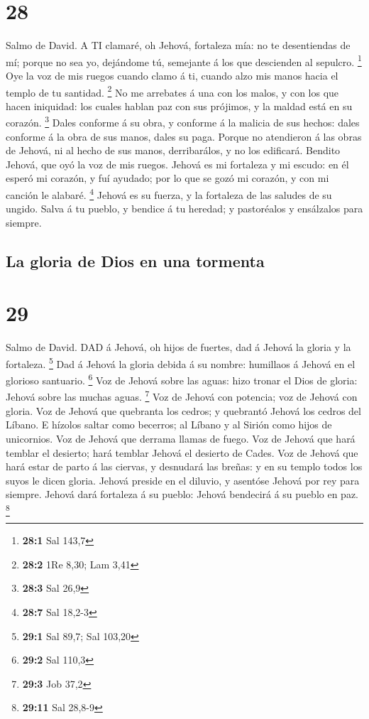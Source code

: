 \hypertarget{section-27}{%
\section{28}\label{section-27}}

 Salmo de David. A TI clamaré, oh Jehová, fortaleza mía: no
te desentiendas de mí; porque no sea yo, dejándome tú, semejante á los
que descienden al sepulcro. \footnote{\textbf{28:1} Sal 143,7}
 Oye la voz de mis ruegos cuando clamo á ti, cuando alzo mis
manos hacia el templo de tu santidad. \footnote{\textbf{28:2} 1Re 8,30;
  Lam 3,41}  No me arrebates á una con los malos, y con los
que hacen iniquidad: los cuales hablan paz con sus prójimos, y la maldad
está en su corazón. \footnote{\textbf{28:3} Sal 26,9}  Dales
conforme á su obra, y conforme á la malicia de sus hechos: dales
conforme á la obra de sus manos, dales su paga.  Porque no
atendieron á las obras de Jehová, ni al hecho de sus manos,
derribarálos, y no los edificará.  Bendito Jehová, que oyó
la voz de mis ruegos.  Jehová es mi fortaleza y mi escudo:
en él esperó mi corazón, y fuí ayudado; por lo que se gozó mi corazón, y
con mi canción le alabaré. \footnote{\textbf{28:7} Sal 18,2-3}
 Jehová es su fuerza, y la fortaleza de las saludes de su
ungido.  Salva á tu pueblo, y bendice á tu heredad; y
pastoréalos y ensálzalos para siempre.

\hypertarget{la-gloria-de-dios-en-una-tormenta}{%
\subsection{La gloria de Dios en una
tormenta}\label{la-gloria-de-dios-en-una-tormenta}}

\hypertarget{section-28}{%
\section{29}\label{section-28}}

 Salmo de David. DAD á Jehová, oh hijos de fuertes, dad á
Jehová la gloria y la fortaleza. \footnote{\textbf{29:1} Sal 89,7; Sal
  103,20}  Dad á Jehová la gloria debida á su nombre:
humillaos á Jehová en el glorioso santuario. \footnote{\textbf{29:2} Sal
  110,3}  Voz de Jehová sobre las aguas: hizo tronar el Dios
de gloria: Jehová sobre las muchas aguas. \footnote{\textbf{29:3} Job
  37,2}  Voz de Jehová con potencia; voz de Jehová con
gloria.  Voz de Jehová que quebranta los cedros; y quebrantó
Jehová los cedros del Líbano.  E hízolos saltar como
becerros; al Líbano y al Sirión como hijos de unicornios. 
Voz de Jehová que derrama llamas de fuego.  Voz de Jehová
que hará temblar el desierto; hará temblar Jehová el desierto de Cades.
 Voz de Jehová que hará estar de parto á las ciervas, y
desnudará las breñas: y en su templo todos los suyos le dicen gloria.
 Jehová preside en el diluvio, y asentóse Jehová por rey
para siempre.  Jehová dará fortaleza á su pueblo: Jehová
bendecirá á su pueblo en paz. \footnote{\textbf{29:11} Sal 28,8-9}

